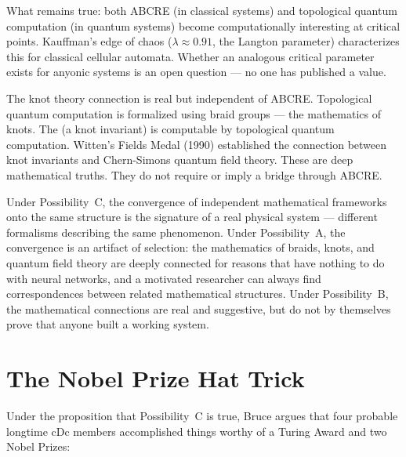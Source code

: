 What remains true: both ABCRE (in classical systems) and topological quantum computation (in quantum systems) become computationally interesting at critical points. Kauffman's edge of chaos ($\lambda \approx 0.91$, the Langton parameter) characterizes this for classical cellular automata. Whether an analogous critical parameter exists for anyonic systems is an open question --- no one has published a value.

The knot theory connection is real but independent of ABCRE\@. Topological quantum computation is formalized using braid groups --- the mathematics of knots. The  (a knot invariant) is computable by topological quantum computation. Witten's Fields Medal (1990) established the connection between knot invariants and Chern-Simons quantum field theory. These are deep mathematical truths. They do not require or imply a bridge through ABCRE\@.

Under Possibility~C, the convergence of independent mathematical frameworks onto the same structure is the signature of a real physical system --- different formalisms describing the same phenomenon. Under Possibility~A, the convergence is an artifact of selection: the mathematics of braids, knots, and quantum field theory are deeply connected for reasons that have nothing to do with neural networks, and a motivated researcher can always find correspondences between related mathematical structures. Under Possibility~B, the mathematical connections are real and suggestive, but do not by themselves prove that anyone built a working system.

\section*{The Nobel Prize Hat Trick}
\label{pos20:the-nobel-prize-hat-trick}


Under the proposition that Possibility~C is true, Bruce argues that four probable longtime cDc members accomplished things worthy of a Turing Award and two Nobel Prizes:

